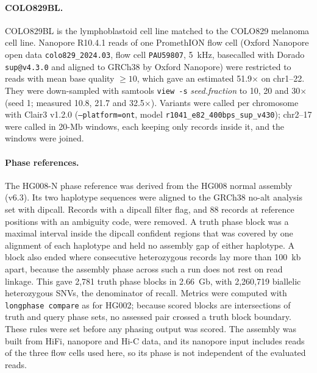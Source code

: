 \documentclass[11pt,a4paper]{article}
\newcommand{\code}[1]{\texttt{\small #1}}
\begin{document}
\paragraph{COLO829BL.} COLO829BL is the lymphoblastoid cell line matched to the COLO829 melanoma cell line\cite{sohn2026colo829}. Nanopore R10.4.1 reads of one PromethION flow cell (Oxford Nanopore open data \code{colo829\_2024.03}, flow cell \code{PAU59807}, 5~kHz, basecalled with Dorado \code{sup@v4.3.0} and aligned to GRCh38 by Oxford Nanopore) were restricted to reads with mean base quality $\ge 10$, which gave an estimated 51.9$\times$ on chr1--22. They were down-sampled with samtools \texttt{view -s} \textit{seed.fraction} to 10, 20 and 30$\times$ (seed 1; measured 10.8, 21.7 and 32.5$\times$). Variants were called per chromosome with Clair3 v1.2.0\cite{zheng2022clair3} (\code{--platform=ont}, model \code{r1041\_e82\_400bps\_sup\_v430}); chr2--17 were called in 20-Mb windows, each keeping only records inside it, and the windows were joined.

\paragraph{Phase references.} The HG008-N phase reference was derived from the HG008 normal assembly (v6.3)\cite{wagner2026hg008asm}. Its two haplotype sequences were aligned to the GRCh38 no-alt analysis set with dipcall\cite{li2018dipcall}. Records with a dipcall filter flag, and 88 records at reference positions with an ambiguity code, were removed. A truth phase block was a maximal interval inside the dipcall confident regions that was covered by one alignment of each haplotype and held no assembly gap of either haplotype. A block also ended where consecutive heterozygous records lay more than 100~kb apart, because the assembly phase across such a run does not rest on read linkage. This gave 2,781 truth phase blocks in 2.66~Gb, with 2,260,719 biallelic heterozygous SNVs, the denominator of recall. Metrics were computed with \code{longphase compare} as for HG002; because scored blocks are intersections of truth and query phase sets, no assessed pair crossed a truth block boundary. These rules were set before any phasing output was scored. The assembly was built from HiFi, nanopore and Hi-C data, and its nanopore input includes reads of the three flow cells used here, so its phase is not independent of the evaluated reads.
\end{document}

